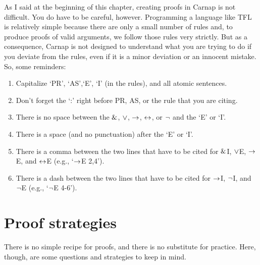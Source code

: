 As I said at the beginning of this chapter, creating proofs in Carnap is not difficult. You do have to be careful, however. Programming a language like TFL is relatively simple because there are only a small number of rules and, to produce proofs of valid arguments, we follow those rules very strictly. But as a consequence, Carnap is not designed to understand what you are trying to do if you deviate from the rules, even if it is a minor deviation or an innocent mistake. So, some reminders:
\begin{enumerate}
\itemsep-.3mm
	\item Capitalize `PR', `AS',`E', `I' (in the rules), and all atomic sentences.
	\item Don't forget the `:' right before PR, AS, or the rule that you are citing. 
	\item There is no space between the $\mathbin{\&}$, $\vee$, $\rightarrow$, $\leftrightarrow$, or ${\neg}$ and the `E' or `I'.  
	\item There is a space (and no punctuation) after the `E' or `I'. 
	\item There is a comma between the two lines that have to be cited for $\mathbin{\&}$I, $\vee$E, $\rightarrow$E, and $\leftrightarrow$E (e.g., `$\rightarrow$E 2,4').
	\item There is a dash between the two lines that have to be cited for $\rightarrow$I, ${\neg}$I, and ${\neg}$E (e.g., `${\neg}$E 4-6').
\end{enumerate}





\chapter{Proof strategies}
There is no simple recipe for proofs, and there is no substitute for practice. Here, though, are some questions and strategies to keep in mind.

